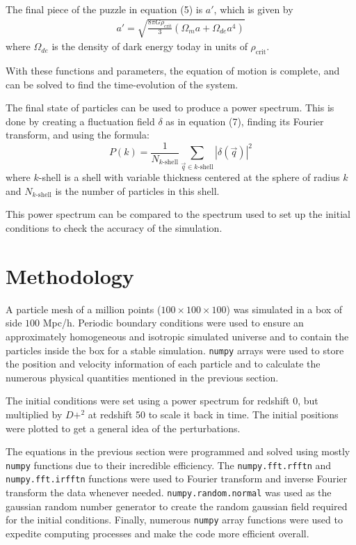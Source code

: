 \documentclass[12pt]{article}   	%
\begin{document}
The final piece of the puzzle in equation (5) is $a'$, which is given by
\begin{align*}
	a' = \sqrt{\frac{8\pi G\rho_{\text{crit}}}{3}(\Omega_ma+\Omega_{de}a^4)}
\end{align*}
where $\Omega_{de}$ is the density of dark energy today in units of $\rho_{\text{crit}}$.

With these functions and parameters, the equation of motion is complete, and can be solved to find
the time-evolution of the system.

The final state of particles can be used to produce a power spectrum. This is done by creating a
fluctuation field $\delta$ as in equation (7), finding its Fourier transform, and using the formula:
\begin{equation}
	P(k) = \frac{1}{N_{k\text{-shell}}}\sum_{\vec q\in k\text{-shell}}|\delta(\vec q)|^2
\end{equation}
where $k$-shell is a shell with variable thickness centered at the sphere of radius $k$ and
$N_{k\text{-shell}}$ is the number of particles in this shell.

This power spectrum can be compared to the spectrum used to set up the initial conditions to check
the accuracy of the simulation.

\section*{Methodology}

A particle mesh of a million points ($100\times100\times100$) was simulated in a box of side $100$ 
Mpc/h. Periodic boundary conditions were used to ensure an approximately homogeneous and isotropic 
simulated universe and to contain the particles inside the box for a stable simulation. \texttt{numpy} 
arrays were used to store the position and velocity information of each particle and to calculate the 
numerous physical quantities mentioned in the previous section.

The initial conditions were set using a power spectrum for redshift 0, but multiplied by $D+^2$ at
redshift 50 to scale it back in time. The initial positions were plotted to get a general idea of the 
perturbations.

The equations in the previous section were programmed and solved using mostly \texttt{numpy} 
functions due to their incredible efficiency. The \texttt{numpy.fft.rfftn} and \texttt{numpy.fft.irfftn} 
functions were used to Fourier transform and inverse Fourier transform the data whenever needed.
\texttt{numpy.random.normal} was used as the gaussian random number generator to create the 
random gaussian field required for the initial conditions. Finally, numerous \texttt{numpy} array functions
were used to expedite computing processes and make the code more efficient overall.
\end{document}

